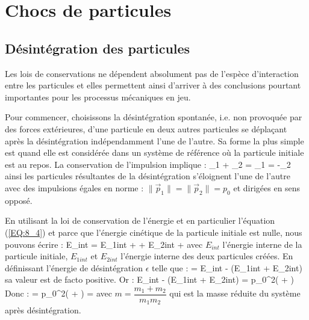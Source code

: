 \chapter{Chocs de particules}

\section{D\'esint\'egration des particules}

Les lois de conservations ne d\'ependent absolument pas de l'esp\`ece d'interaction entre les particules et elles permettent ainsi d'arriver \`a des conclusions pourtant importantes pour les processus m\'ecaniques en jeu.

Pour commencer, choisissons la d\'esint\'egration spontan\'ee, i.e. non provoqu\'ee par des forces ext\'erieures, d'une particule en deux autres particules se d\'epla\c{c}ant apr\`es la d\'esint\'egration ind\'ependamment l'une de l'autre. Sa forme la plus simple est quand elle est consid\'er\'{e}e dans un syst\`eme de r\'ef\'erence o\`u la particule initiale est au repos. La conservation de l'impulsion implique :
\benn
	_{1} + _{2} =  \Leftrightarrow {}_{1} = -_{2}
\eenn
ainsi les particules r\'esultantes de la d\'esint\'egration s'\'eloignent l'une de l'autre avec des impulsions \'egales en norme : $\lVert \vec{p}_{1} \rVert = \lVert \vec{p}_{2} \rVert = p_{0}$ et dirig\'ees en sens oppos\'{e}.

En utilisant la loi de conservation de l'\'energie et en particulier l'\'equation (\ref{EQ:8_4}) et parce que l'\'energie cin\'etique de la particule initiale est nulle, nous pouvons \'ecrire :
\benn
	E_{int} = E_{1int} +  + E_{2int} + 
\eenn
avec $E_{int}$ l'\'energie interne de la particule initiale, $E_{1int}$ et $E_{2int}$ l'\'energie interne des deux particules cr\'e\'ees. En d\'efinissant l'\'energie de d\'esint\'egration $\epsilon$ telle que :
\be
	\epsilon = E_{int} - (E_{1int} + E_{2int}) \label{EQ:16_1}
\ee
sa valeur est de facto positive. Or :
\benn
	E_{int} - (E_{1int} + E_{2int}) = p_{0}^{2}\left( + \right)
\eenn
Donc :
\be
	\epsilon = p_{0}^{2}\left( + \right) =  \label{EQ:16_2}
\ee
avec $m = \dfrac{m_{1} + m_{2}}{m_{1}m_{2}}$ qui est la masse r\'eduite du syst\`eme apr\`es d\'esint\'egration.

